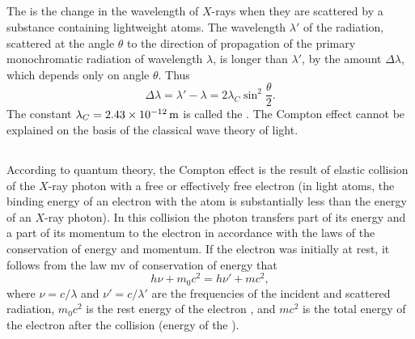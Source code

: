 \subsection{}\label{37.3.1} The  is the change in the wavelength of $X$-rays when they are scattered by a substance containing lightweight atoms. The wavelength $\lambda'$ of the radiation, scattered at the angle $\theta$ to the direction of propagation of the primary monochromatic
radiation of wavelength $\lambda$, is longer than $\lambda'$, by the amount $\Delta \lambda$, which depends only on angle $\theta$. Thus
\begin{equation*}%
\Delta \lambda = \lambda' - \lambda  = 2 \lambda_{C} \sin^{2} \frac{\theta}{2}.
\end{equation*}
The constant $\lambda_{C}  = \SI{2.43d-12}{\meter}$ is called the . The Compton effect cannot be explained on the basis of the classical wave theory of light.

\subsection{}\label{37.3.2} According to quantum theory, the Compton effect is the result of elastic collision of the $X$-ray photon with a free or effectively free electron (in light atoms, the binding energy of an electron with the atom is substantially less than the energy of an $X$-ray photon). In this collision the photon transfers part of its energy and a part of its momentum to the electron in accordance with the laws of the conservation of energy and momentum. If the electron was initially at rest, it follows from the law mv
of conservation of energy that
\begin{equation*}%
h\nu + m_{0}c^{2} = h\nu' + mc^{2}, \tag{a}
\end{equation*}
where $\nu = c/ \lambda$ and $\nu' = c/ \lambda'$ are the
frequencies of the incident and scattered radiation, $m_{0}c^{2}$ is the rest energy of the electron , and $mc^{2}$ is the total energy of the electron  after the collision (energy of the ).

